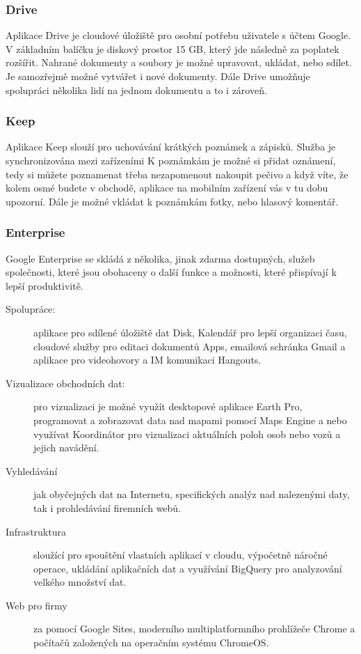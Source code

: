 \subsubsection{Drive}
Aplikace Drive je cloudové úložiště pro osobní potřebu uživatele s účtem Google. V základním balíčku je diskový prostor 15 GB, který jde následně za poplatek rozšířit. Nahrané dokumenty a soubory je možné upravovat, ukládat, nebo sdílet. Je samozřejmě možné vytvářet i nové dokumenty. Dále Drive umožňuje spolupráci několika lidí na jednom dokumentu a to i zároveň.

\subsubsection{Keep}
Aplikace Keep slouží pro uchovávání krátkých poznámek a zápisků. Služba je synchronizována mezi zařízeními K poznámkám je možné si přidat oznámení, tedy si můžete poznamenat třeba nezapomenout nakoupit pečivo a když víte, že kolem osmé budete v obchodě, aplikace na mobilním zařízení vás v tu dobu upozorní. Dále je možné vkládat k poznámkám fotky, nebo hlasový komentář.

\subsubsection{Enterprise}
Google Enterprise se skládá z několika, jinak zdarma dostupných, služeb společnosti, které jsou obohaceny o další funkce a možnosti, které přispívají k lepší produktivitě.
\begin{description}
	\item[Spolupráce:] aplikace pro sdílené úložiště dat Disk, Kalendář pro lepší organizaci času, cloudové služby pro editaci dokumentů Apps, emailová schránka Gmail a aplikace pro videohovory a IM komunikaci Hangouts.
	\item[Vizualizace obchodních dat:] pro vizualizaci je možné využít desktopové aplikace Earth Pro, programovat a zobrazovat data nad mapami pomocí Maps Engine a nebo využívat Koordinátor pro vizualizaci aktuálních poloh osob nebo vozů a jejich navádění.
	\item[Vyhledávání] jak obyčejných dat na Internetu, specifických analýz nad nalezenými daty, tak i prohledávání firemních webů.
	\item[Infrastruktura] sloužící pro spouštění vlastních aplikací v cloudu, výpočetně náročné operace, ukládání aplikačních dat a využívání BigQuery pro analyzování velkého množství dat.
	\item[Web pro firmy] za pomocí Google Sites, moderního multiplatformního prohlížeče Chrome a počítačů založených na operačním systému ChromeOS.
\end{description}

